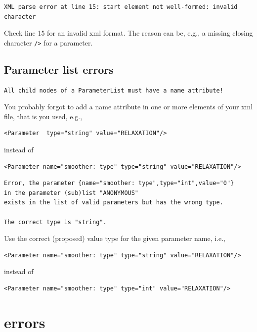 \documentclass[10pt,fleqn]{book}
\begin{document}
\begin{cBox}
\begin{lstlisting}
XML parse error at line 15: start element not well-formed: invalid character
\end{lstlisting}
\end{cBox}
Check line 15 for an invalid xml format. The reason can be, e.g., a missing closing character \verb|/>| for a parameter.

\subsection{Parameter list errors}
\begin{cBox}
\begin{lstlisting}
All child nodes of a ParameterList must have a name attribute!
\end{lstlisting}
\end{cBox}
You probably forgot to add a name attribute in one or more elements of your xml file, that is you used, e.g.,
\begin{lstlisting}
<Parameter  type="string" value="RELAXATION"/>
\end{lstlisting}
instead of
\begin{lstlisting}
<Parameter name="smoother: type" type="string" value="RELAXATION"/>
\end{lstlisting}



\begin{cBox}
\begin{lstlisting}
Error, the parameter {name="smoother: type",type="int",value="0"}
in the parameter (sub)list "ANONYMOUS"
exists in the list of valid parameters but has the wrong type.

The correct type is "string".
\end{lstlisting}
\end{cBox}
Use the correct (proposed) value type for the given parameter name, i.e.,
\begin{lstlisting}
<Parameter name="smoother: type" type="string" value="RELAXATION"/>
\end{lstlisting}
instead of
\begin{lstlisting}
<Parameter name="smoother: type" type="int" value="RELAXATION"/>
\end{lstlisting}

\section{\muelu errors}
\end{document}
